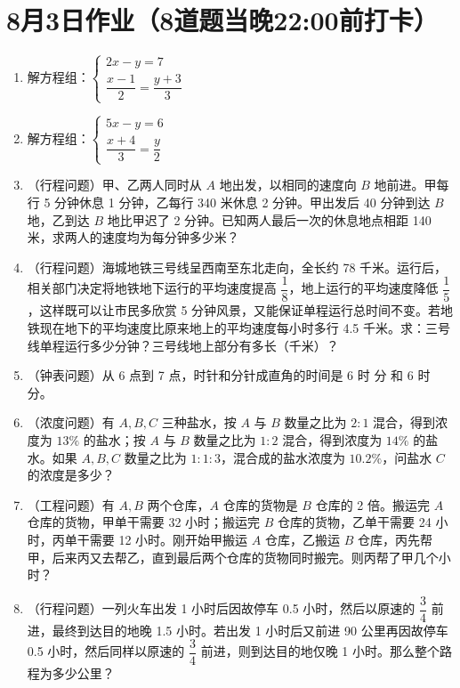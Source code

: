 \documentclass[UTF8,12pt,a4paper]{ctexart}
\newcommand{\BottomWriteSpace}{0.5cm}
\newenvironment{OnePageEightFill}{
  \small
  \vspace*{0pt}
  \begin{enumerate}[leftmargin=*, itemsep=0pt, topsep=0pt, parsep=0pt, partopsep=0pt]
  \setlength{\parskip}{0pt}
}{
  \end{enumerate}
  \vspace*{\BottomWriteSpace}
  \normalsize
  \newpage
}
\newcommand{\Q}[1]{\item #1\par\vfill}
\newcommand{\Qlast}[1]{\item #1\par}
\begin{document}
\section*{8月3日作业（8道题当晚22:00前打卡）}
\begin{OnePageEightFill}

\Q{解方程组：$\begin{cases} 2x - y = 7 \\ \dfrac{x-1}{2} = \dfrac{y+3}{3} \end{cases}$}

\Q{解方程组：$\begin{cases} 5x - y = 6 \\ \dfrac{x+4}{3} = \dfrac{y}{2} \end{cases}$}

\Q{（行程问题）甲、乙两人同时从 $A$ 地出发，以相同的速度向 $B$ 地前进。甲每行 5 分钟休息 1 分钟，乙每行 340 米休息 2 分钟。甲出发后 40 分钟到达 $B$ 地，乙到达 $B$ 地比甲迟了 2 分钟。已知两人最后一次的休息地点相距 140 米，求两人的速度均为每分钟多少米？}

\Q{（行程问题）海城地铁三号线呈西南至东北走向，全长约 78 千米。运行后，相关部门决定将地铁地下运行的平均速度提高 $\dfrac{1}{8}$，地上运行的平均速度降低 $\dfrac{1}{5}$，这样既可以让市民多欣赏 5 分钟风景，又能保证单程运行总时间不变。若地铁现在地下的平均速度比原来地上的平均速度每小时多行 4.5 千米。求：三号线单程运行多少分钟？三号线地上部分有多长（千米）？}

\Q{（钟表问题）从 6 点到 7 点，时针和分针成直角的时间是 6 时 \underline{\hspace{3em}} 分 和 6 时 \underline{\hspace{3em}} 分。}

\Q{（浓度问题）有 $A, B, C$ 三种盐水，按 $A$ 与 $B$ 数量之比为 $2:1$ 混合，得到浓度为 $13\%$ 的盐水；按 $A$ 与 $B$ 数量之比为 $1:2$ 混合，得到浓度为 $14\%$ 的盐水。如果 $A, B, C$ 数量之比为 $1:1:3$，混合成的盐水浓度为 $10.2\%$，问盐水 $C$ 的浓度是多少？}

\Q{（工程问题）有 $A, B$ 两个仓库，$A$ 仓库的货物是 $B$ 仓库的 2 倍。搬运完 $A$ 仓库的货物，甲单干需要 32 小时；搬运完 $B$ 仓库的货物，乙单干需要 24 小时，丙单干需要 12 小时。刚开始甲搬运 $A$ 仓库，乙搬运 $B$ 仓库，丙先帮甲，后来丙又去帮乙，直到最后两个仓库的货物同时搬完。则丙帮了甲几个小时？}

\Qlast{（行程问题）一列火车出发 1 小时后因故停车 0.5 小时，然后以原速的 $\dfrac{3}{4}$ 前进，最终到达目的地晚 1.5 小时。若出发 1 小时后又前进 90 公里再因故停车 0.5 小时，然后同样以原速的 $\dfrac{3}{4}$ 前进，则到达目的地仅晚 1 小时。那么整个路程为多少公里？}

\end{OnePageEightFill}
\end{document}
